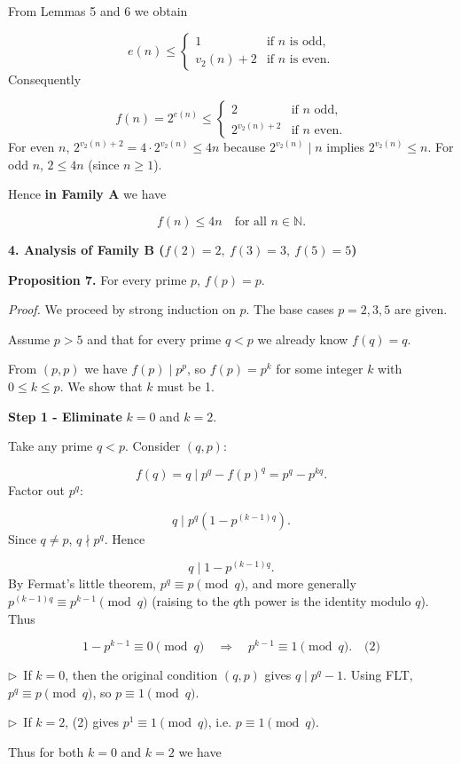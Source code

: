 \documentclass{llmxive}
\providecommand{\solutionheading}[1]{\par\smallskip\noindent\textbf{#1}\par}
\providecommand{\compactbullet}[1]{\par\noindent$\triangleright$~#1\par}
\begin{document}
From Lemmas 5 and 6 we obtain

\[
e(n)\le \begin{cases}
1 & \text{if } n \text{ is odd},\\
v_{2}(n)+2 & \text{if } n \text{ is even}.
\end{cases}
\]
Consequently\par
\[
f(n)=2^{e(n)}\le \begin{cases}
2 & \text{if } n \text{ odd},\\
2^{v_{2}(n)+2} & \text{if } n \text{ even}.
\end{cases}
\]
For even \(n\), \(2^{v_{2}(n)+2}=4\cdot2^{v_{2}(n)}\le 4n\) because \(2^{v_{2}(n)}\mid n\) implies \(2^{v_{2}(n)}\le n\). For odd \(n\), \(2\le 4n\) (since \(n\ge1\)).\par
Hence \textbf{in Family A} we have\par
\[
\boxed{f(n)\le4n\quad\text{for all }n\in\mathbb N}.
\]
\smallskip
\solutionheading{4. Analysis of Family B (\(f(2)=2,\ f(3)=3,\ f(5)=5\))}
\textbf{Proposition 7.} For every prime \(p\), \(f(p)=p\).\par
\emph{Proof.} We proceed by strong induction on \(p\). The base cases \(p=2,3,5\) are given.\par
Assume \(p>5\) and that for every prime \(q<p\) we already know \(f(q)=q\).\par
From \((p,p)\) we have \(f(p)\mid p^{p}\), so \(f(p)=p^{k}\) for some integer \(k\) with \(0\le k\le p\). We show that \(k\) must be 1.\par
\smallskip
\textbf{Step 1 - Eliminate }\(k=0\) and \(k=2\).\textbf{}\par
Take any prime \(q<p\). Consider \((q,p)\):\par
\[
f(q)=q\mid p^{q}-f(p)^{q}=p^{q}-p^{kq}.
\]
Factor out \(p^{q}\):\par
\[
q\mid p^{q}(1-p^{(k-1)q}).
\]
Since \(q\neq p\), \(q\nmid p^{q}\). Hence\par
\[
q\mid 1-p^{(k-1)q}.
\]
By Fermat's little theorem, \(p^{q}\equiv p\pmod q\), and more generally \(p^{(k-1)q}\equiv p^{k-1}\pmod q\) (raising to the \(q\)th power is the identity modulo \(q\)). Thus\par
\[
1-p^{k-1}\equiv 0\pmod q\quad\Longrightarrow\quad p^{k-1}\equiv 1\pmod q. \quad\text{(2)}
\]
\compactbullet{If \(k=0\), then the original condition \((q,p)\) gives \(q\mid p^{q}-1\). Using FLT, \(p^{q}\equiv p\pmod q\), so \(p\equiv1\pmod q\).}
\compactbullet{If \(k=2\), (2) gives \(p^{1}\equiv1\pmod q\), i.e. \(p\equiv1\pmod q\).}
Thus for both \(k=0\) and \(k=2\) we have\par
\end{document}
